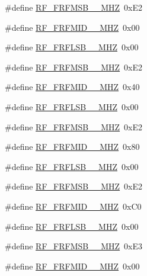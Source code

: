 \begin{DoxyCompactItemize}
\item 
\#define \mbox{\hyperlink{sx1276_regs-_fsk_8h_ac103def8b55db2e68ecd74f622d05ec8}{R\+F\+\_\+\+F\+R\+F\+M\+S\+B\+\_\+\_\+\+M\+HZ}}~0x\+E2
\item 
\#define \mbox{\hyperlink{sx1276_regs-_fsk_8h_a68c181778920969fd320960aa9b8540a}{R\+F\+\_\+\+F\+R\+F\+M\+I\+D\+\_\+\_\+\+M\+HZ}}~0x00
\item 
\#define \mbox{\hyperlink{sx1276_regs-_fsk_8h_ad6aa652c01dd83e83eee08310a4ab27d}{R\+F\+\_\+\+F\+R\+F\+L\+S\+B\+\_\+\_\+\+M\+HZ}}~0x00
\item 
\#define \mbox{\hyperlink{sx1276_regs-_fsk_8h_acf4419e259f3ac0eaa240b5d276f2783}{R\+F\+\_\+\+F\+R\+F\+M\+S\+B\+\_\+\_\+\+M\+HZ}}~0x\+E2
\item 
\#define \mbox{\hyperlink{sx1276_regs-_fsk_8h_a5805cba8302e2b4cc090072e27e9b74a}{R\+F\+\_\+\+F\+R\+F\+M\+I\+D\+\_\+\_\+\+M\+HZ}}~0x40
\item 
\#define \mbox{\hyperlink{sx1276_regs-_fsk_8h_a54bc243265f355ba3398eaf560182add}{R\+F\+\_\+\+F\+R\+F\+L\+S\+B\+\_\+\_\+\+M\+HZ}}~0x00
\item 
\#define \mbox{\hyperlink{sx1276_regs-_fsk_8h_a55862c6f4752ba5add661f520ef78d85}{R\+F\+\_\+\+F\+R\+F\+M\+S\+B\+\_\+\_\+\+M\+HZ}}~0x\+E2
\item 
\#define \mbox{\hyperlink{sx1276_regs-_fsk_8h_ab9eed26517ae9101715c14e1f6ebe36a}{R\+F\+\_\+\+F\+R\+F\+M\+I\+D\+\_\+\_\+\+M\+HZ}}~0x80
\item 
\#define \mbox{\hyperlink{sx1276_regs-_fsk_8h_a51b43142f8e6f359f3fa9a2de957b0d6}{R\+F\+\_\+\+F\+R\+F\+L\+S\+B\+\_\+\_\+\+M\+HZ}}~0x00
\item 
\#define \mbox{\hyperlink{sx1276_regs-_fsk_8h_ac90d9f82ccd48696f5f6d5f3da034c95}{R\+F\+\_\+\+F\+R\+F\+M\+S\+B\+\_\+\_\+\+M\+HZ}}~0x\+E2
\item 
\#define \mbox{\hyperlink{sx1276_regs-_fsk_8h_ae7d275a31f9ef6141362da97cbc82ba0}{R\+F\+\_\+\+F\+R\+F\+M\+I\+D\+\_\+\_\+\+M\+HZ}}~0x\+C0
\item 
\#define \mbox{\hyperlink{sx1276_regs-_fsk_8h_a69c1b7d68cd9e8efbd11af9bf2d23141}{R\+F\+\_\+\+F\+R\+F\+L\+S\+B\+\_\+\_\+\+M\+HZ}}~0x00
\item 
\#define \mbox{\hyperlink{sx1276_regs-_fsk_8h_a46d253ce6ced063cf1d1ac2790b6b655}{R\+F\+\_\+\+F\+R\+F\+M\+S\+B\+\_\+\_\+\+M\+HZ}}~0x\+E3
\item 
\#define \mbox{\hyperlink{sx1276_regs-_fsk_8h_a1113a7007b474ba7a126649cd5000ed7}{R\+F\+\_\+\+F\+R\+F\+M\+I\+D\+\_\+\_\+\+M\+HZ}}~0x00

\end{DoxyCompactItemize}
